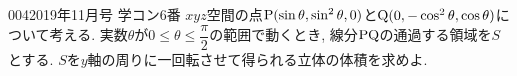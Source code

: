 \begin{prob}{004}{}{2019年11月号 学コン6番}
 $xyz$空間の点${\rm P}(\sin{\theta}, \sin^2{\theta}, 0)$と${\rm Q}(0,-\cos^2{\theta}, \cos{\theta})$について考える.
 実数$\theta$が$0\leq \theta\leq \dfrac{\pi}{2}$の範囲で動くとき, 線分${\rm PQ}$の通過する領域を$S$とする. $S$を$y$軸の周りに一回転させて得られる立体の体積を求めよ.
\end{prob}
